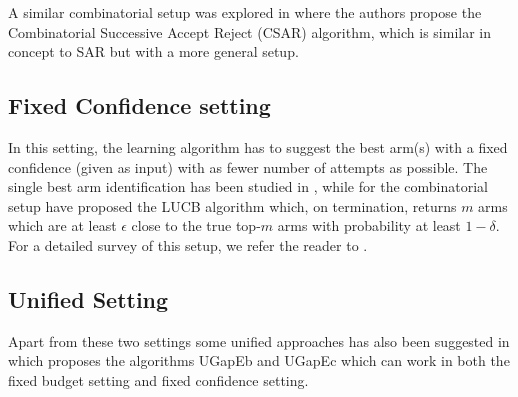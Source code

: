     A similar combinatorial setup was explored in \citet{chen2014combinatorial} where the authors propose the Combinatorial Successive Accept Reject (CSAR) algorithm, which is similar in concept to SAR but with a more general setup. 

 
\subsection{Fixed Confidence setting} 

In this setting, the learning algorithm has to suggest the best arm(s) with a fixed confidence (given as input) with as fewer number of attempts as possible. The single best arm identification has been studied in \citet{even2006action}, while for the combinatorial setup \citet{kalyanakrishnan2012pac} have proposed the LUCB algorithm which, on termination, returns  $m$ arms which are at least $\epsilon$ close to the true top-$m$ arms with probability at least $1-\delta$. For a detailed survey of this setup, we refer the reader to \citet{jamieson2014best}. 

\subsection{Unified Setting}
Apart from these two settings some unified approaches has also been suggested in \citet{gabillon2012best} which proposes the algorithms UGapEb and UGapEc which can work in both the fixed budget setting and fixed confidence  setting. 



    
    
